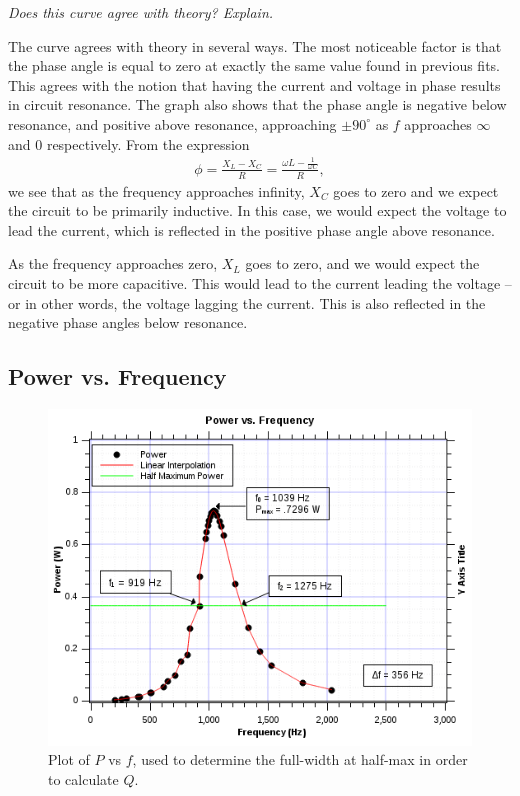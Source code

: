 \documentclass[twocolumn,english]{IEEEtran}
\theoremstyle{plain}
\theoremstyle{plain}
\begin{document}
\textit{Does this curve agree with theory? Explain.}

The curve agrees with theory in several ways. The most noticeable factor is that the phase angle is equal to zero at exactly the same value found in previous fits. This agrees with the notion that having the current and voltage in phase results in circuit resonance. The graph also shows that the phase angle is negative below resonance, and positive above resonance, approaching $\pm 90^{\circ}$ as $f$ approaches $\infty$ and $0$ respectively. From the expression
\begin{align}
	\phi = \frac{X_L-X_C}{R} = \frac{\omega L - \frac{1}{\omega C}}{R},
\end{align}
we see that as the frequency approaches infinity, $X_C$ goes to zero and we expect the circuit to be primarily inductive. In this case, we would expect the voltage to lead the current, which is reflected in the positive phase angle above resonance.

As the frequency approaches zero, $X_L$ goes to zero, and we would expect the circuit to be more capacitive. This would lead to the current leading the voltage -- or in other words, the voltage lagging the current. This is also reflected in the negative phase angles below resonance.

\hrulefill

\subsection{Power vs. Frequency}

\begin{figure}[H]
	\begin{centering}
	\begin{center}
	\includegraphics[width=\linewidth]{./Images/Part8.png}
	\caption{Plot of $P$ vs $f$, used to determine the full-width at half-max in order to calculate $Q$.}
	\label{fig:PowervsFreq}
	\end{center}
	\par\end{centering}
\end{figure}
\end{document}
